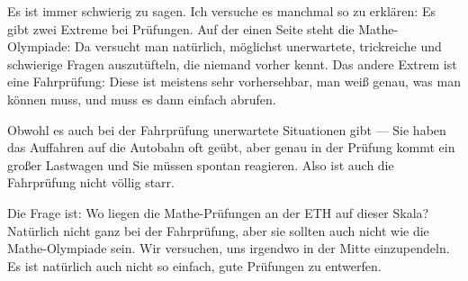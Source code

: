 \begin{spoken-clean}[01:24:19 - 01:26:29]
Es ist immer schwierig zu sagen. Ich versuche es manchmal so zu erklären: Es gibt zwei Extreme bei Prüfungen. Auf der einen Seite steht die Mathe-Olympiade: Da versucht man natürlich, möglichst unerwartete, trickreiche und schwierige Fragen auszutüfteln, die niemand vorher kennt. Das andere Extrem ist eine Fahrprüfung: Diese ist meistens sehr vorhersehbar, man weiß genau, was man können muss, und muss es dann einfach abrufen.

Obwohl es auch bei der Fahrprüfung unerwartete Situationen gibt --- Sie haben das Auffahren auf die Autobahn oft geübt, aber genau in der Prüfung kommt ein großer Lastwagen und Sie müssen spontan reagieren. Also ist auch die Fahrprüfung nicht völlig starr.

Die Frage ist: Wo liegen die Mathe-Prüfungen an der ETH auf dieser Skala? Natürlich nicht ganz bei der Fahrprüfung, aber sie sollten auch nicht wie die Mathe-Olympiade sein. Wir versuchen, uns irgendwo in der Mitte einzupendeln. Es ist natürlich auch nicht so einfach, gute Prüfungen zu entwerfen.
\end{spoken-clean}

\begin{math-stroke}
\begin{center}
\end{center}
\end{math-stroke}

